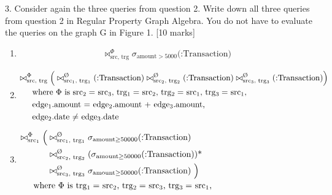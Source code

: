 \documentclass[12pt]{article}
\begin{document}
3. Consider again the three queries from question 2. Write down all three
queries from question 2 in Regular Property Graph Algebra. You do not
have to evaluate the queries on the graph G in Figure 1. [10 marks]


\begin{enumerate}[label=(\alph*)]
    \item 
    
    \begin{equation*}
    \begin{aligned}
        \bowtie^{\Phi}_{\text{src, trg}}\sigma_{\text{amount} > 5000}\text{(:Transaction)}
    \end{aligned}
    \end{equation*}

    \item

    \begin{equation*}
    \begin{aligned}
        \bowtie^{\Phi}_{\text{src, trg}}
        \Big(
            \bowtie^{\text{\O}}_{\text{src$_1$, trg$_1$}}\text{(:Transaction)}
            \bowtie^{\text{\O}}_{\text{src$_2$, trg$_2$}}\text{(:Transaction)}
            \bowtie^{\text{\O}}_{\text{src$_3$, trg$_3$}}\text{(:Transaction)}
        \Big) \\
        \noalign{where $\Phi$ is src$_2=$ src$_3$, trg$_1=$ src$_2$, trg$_2=$ src$_1$, trg$_3=$ src$_1$,}
        \noalign{edge$_1$.amount = edge$_2$.amount + edge$_3$.amount,}
        \noalign{edge$_2$.date $\ne$ edge$_3$.date}
    \end{aligned}
    \end{equation*}

    \item 

    \begin{equation*}
    \begin{aligned}
        \bowtie^{\Phi}_{\text{src$_1$}}
        \Big(
        & \bowtie^{\text{\O}}_{\text{src$_1$, trg$_1$}}\sigma_{\text{amount} \ge 50000}\text{(:Transaction) } \\
        & \bowtie^{\text{\O}}_{\text{src$_2$, trg$_2$}}(\sigma_{\text{amount} \ge 50000}\text{(:Transaction))*} \\
        & \bowtie^{\text{\O}}_{\text{src$_3$, trg$_3$}}\sigma_{\text{amount} \ge 50000}\text{(:Transaction) }
        \Big) \\
        \noalign{where $\Phi$ is trg$_1=$ src$_2$, trg$_2=$ src$_3$, trg$_3=$ src$_1$,}
    \end{aligned}
    \end{equation*}

\end{enumerate}
\end{document}
